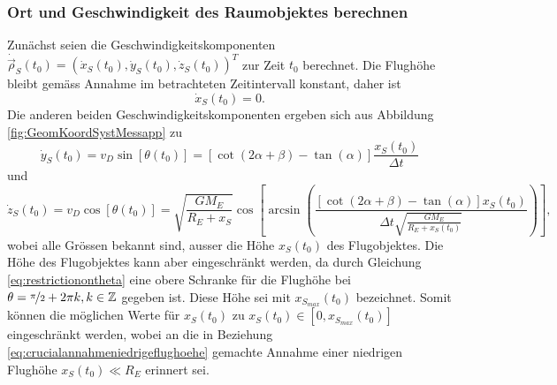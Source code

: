 \documentclass[a4paper,12pt]{article}
\numberwithin{equation}{section}
\begin{document}
\subsubsection{Ort und Geschwindigkeit des Raumobjektes berechnen}
Zunächst seien die Geschwindigkeitskomponenten $\dot{\vec{\rho}}_S(t_0) = (\dot{x}_S(t_0),\dot{y}_S(t_0),\dot{z}_S(t_0))^T$ zur Zeit $t_0$ berechnet. Die Flughöhe bleibt gemäss Annahme im betrachteten Zeitintervall konstant, daher ist \begin{equation} \dot{x}_S(t_0) = 0. \end{equation} Die anderen beiden Geschwindigkeitskomponenten ergeben sich aus Abbildung \ref{fig:GeomKoordSystMessapp} zu 
\begin{equation}
\dot{y}_S(t_0) = v_D\sin[\theta(t_0)] = [ \cot(2\alpha+\beta)-\tan(\alpha)]\frac{x_S(t_0)}{\Delta t}
\end{equation} und \small \begin{equation}
\dot{z}_S(t_0) = v_D\cos[\theta(t_0)] = \sqrt{\frac{GM_E}{R_E+x_S}}\cos\left[\arcsin\left(\frac{[\cot(2\alpha+\beta)-\tan(\alpha)]x_S(t_0)}{\Delta t\sqrt{\frac{GM_E}{R_E+x_S(t_0)}}}\right)\right],
\end{equation} \normalsize
wobei alle Grössen bekannt sind, ausser die Höhe $x_S(t_0)$ des Flugobjektes. Die Höhe des Flugobjektes kann aber eingeschränkt werden, da durch Gleichung \eqref{eq:restrictionontheta} eine obere Schranke für die Flughöhe bei $\theta = \nicefrac{\pi}{2}+2\pi k, k \in \mathbb{Z}$ gegeben ist. Diese Höhe sei mit $x_{S_{max}}(t_0)$ bezeichnet. Somit können die möglichen Werte für $x_S(t_0)$ zu $x_S(t_0) \in [0, x_{S_{max}}(t_0)]$ eingeschränkt werden, wobei an die in Beziehung \eqref{eq:crucialannahmeniedrigeflughoehe} gemachte Annahme einer niedrigen Flughöhe $x_S(t_0) \ll R_E$ erinnert sei.
\end{document}
